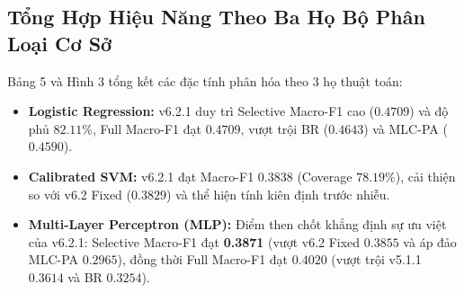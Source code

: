 \documentclass[10pt,a4paper,twoside]{article}
\begin{document}
\subsection{Tổng Hợp Hiệu Năng Theo Ba Họ Bộ Phân Loại Cơ Sở}
Bảng 5 và Hình 3 tổng kết các đặc tính phân hóa theo 3 họ thuật toán:
\begin{itemize}[leftmargin=*]
    \item \textbf{Logistic Regression:} v6.2.1 duy trì Selective Macro-F1 cao ($0.4709$) và độ phủ $82.11\%$, Full Macro-F1 đạt $0.4709$, vượt trội BR ($0.4643$) và MLC-PA ($0.4590$).
    \item \textbf{Calibrated SVM:} v6.2.1 đạt Macro-F1 $0.3838$ (Coverage $78.19\%$), cải thiện so với v6.2 Fixed ($0.3829$) và thể hiện tính kiên định trước nhiễu.
    \item \textbf{Multi-Layer Perceptron (MLP):} Điểm then chốt khẳng định sự ưu việt của v6.2.1: Selective Macro-F1 đạt \textbf{0.3871} (vượt v6.2 Fixed $0.3855$ và áp đảo MLC-PA $0.2965$), đồng thời Full Macro-F1 đạt $0.4020$ (vượt trội v5.1.1 $0.3614$ và BR $0.3254$).
\end{itemize}
\end{document}

